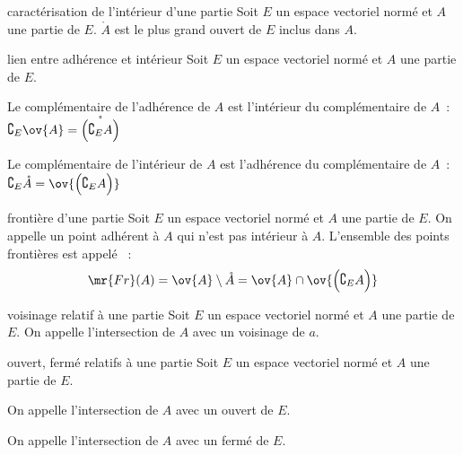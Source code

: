 \begin{adjustwidth}{-3cm}{-3cm}
\begin{theoreme}{4.24}{caractérisation de l'intérieur d'une partie}
    Soit $E$ un espace vectoriel normé et $A$ une partie de $E$. $\mathring{A}$ est le plus grand ouvert de $E$ inclus dans $A$.
\end{theoreme}

\begin{theoreme}{4.25}{lien entre adhérence et intérieur}
    Soit $E$ un espace vectoriel normé et $A$ une partie de $E$.
    \begin{enumeratebf}
        \item Le complémentaire de l’adhérence de $A$ est l’intérieur du complémentaire de $A$~: $\complement_E \ov{A} = \mathring{\Big(\complement_E A \Big)}$
        \item Le complémentaire de l’intérieur de $A$ est l’adhérence du complémentaire de $A$~: $\complement_E \mathring{A} = \ov{\Big(\complement_E A \Big)}$
    \end{enumeratebf}
\end{theoreme}

\begin{definition}{4.26}{frontière d'une partie}
    Soit $E$ un espace vectoriel normé et $A$ une partie de $E$. On appelle  un point adhérent à $A$ qui n’est pas intérieur à $A$. L’ensemble des points frontières
est appelé ~:
$$\mr{Fr}(A) = \ov{A}  \setminus \mathring{A} = \ov{A} \cap \ov{\Big(\complement_E A\Big)}$$
\end{definition}

\begin{definition}{4.29}{voisinage relatif à une partie}
    Soit $E$ un espace vectoriel normé et $A$ une partie de $E$. On appelle  l'intersection de $A$ avec un voisinage de $a$.
\end{definition}

\begin{definition}{4.30}{ouvert, fermé relatifs à une partie}
    Soit $E$ un espace vectoriel normé et $A$ une partie de $E$. 
    \begin{enumeratebf}
        \item On appelle  l'intersection de $A$ avec un ouvert de $E$.
        \item On appelle  l'intersection de $A$ avec un fermé de $E$.
    \end{enumeratebf}
\end{definition}


\end{adjustwidth}
